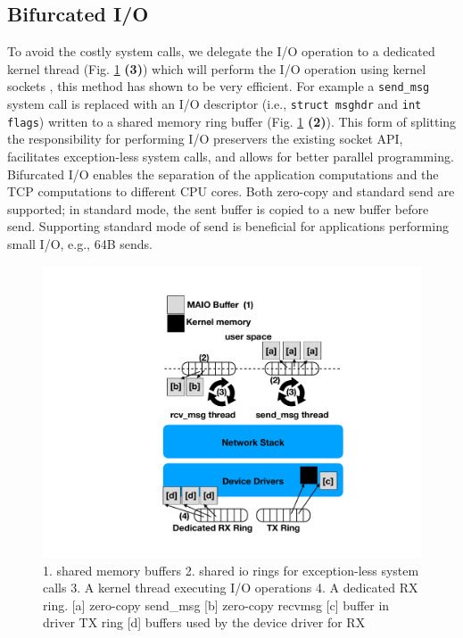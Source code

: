 \subsection{Bifurcated I/O}\label{sec:bifurcated}
To avoid the costly system calls, we delegate the I/O operation to a dedicated kernel thread (Fig. \ref{fig:our_sys} \textbf{(3)}) which will perform the I/O operation using kernel sockets \cite{ktcp}, this method has shown to be very efficient. For example a \texttt{send\_msg} system call is replaced with an I/O descriptor (i.e., \texttt{struct msghdr} and \texttt{int flags}) written to a shared memory ring buffer (Fig. \ref{fig:our_sys} \textbf{(2)}). This form of splitting the responsibility for performing I/O preservers the existing socket API, facilitates exception-less system calls, and allows for better parallel programming. Bifurcated I/O enables the separation of the application computations and the TCP computations to different CPU cores. Both zero-copy and standard send are supported; in standard mode, the sent buffer is copied to a new \oursys buffer before send. Supporting standard mode of send is beneficial for applications performing small I/O, e.g., 64B sends.



\begin{figure}[t]
    \centering
    \includegraphics[width=0.8\columnwidth]{ktcp_z.pdf}
    \caption{1. \oursys shared memory buffers 2. shared io rings for exception-less system calls 3. A kernel thread executing I/O operations 4. A dedicated RX ring.
    [a] zero-copy send\_msg [b] zero-copy recvmsg [c] \oursys buffer in driver TX ring [d] \oursys buffers used by the device driver for RX}
    \label{fig:our_sys}
\end{figure} 

